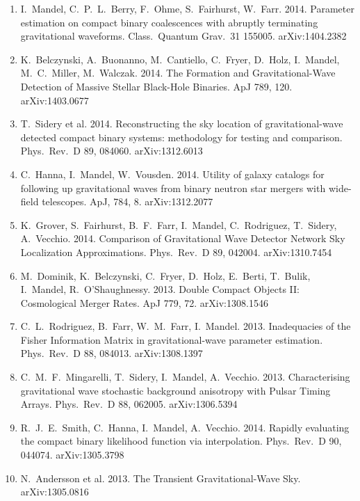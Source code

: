 \documentclass[margin,line]{res}
\begin{document}
\begin{resume}
\begin{enumerate}
\item  I.~Mandel, C.~P.~L.~Berry, F.~Ohme, S.~Fairhurst, W.~Farr.  2014. Parameter estimation on compact binary coalescences with abruptly terminating gravitational waveforms.  Class.~Quantum Grav.~31 155005. arXiv:1404.2382

\item  K.~Belczynski, A.~Buonanno, M.~Cantiello, C.~Fryer, D.~Holz, I.~Mandel, M.~C.~Miller, M.~Walczak.  2014. The Formation and Gravitational-Wave Detection of Massive Stellar Black-Hole Binaries.  ApJ 789, 120. arXiv:1403.0677

\item  T.~Sidery et al. 2014. Reconstructing the sky location of gravitational-wave detected compact binary systems: methodology for testing and comparison.  Phys.~Rev.~D 89, 084060.  arXiv:1312.6013

\item  C.~Hanna, I.~Mandel, W.~Vousden.  2014. Utility of galaxy catalogs for following up gravitational waves from binary neutron star mergers with wide-field telescopes. ApJ, 784, 8.  arXiv:1312.2077

\item  K.~Grover, S.~Fairhurst, B.~F.~Farr, I.~Mandel, C.~Rodriguez, T.~Sidery, A.~Vecchio.  2014.  Comparison of Gravitational Wave Detector Network Sky Localization Approximations.  Phys.~Rev.~D 89, 042004.  arXiv:1310.7454

\item  M.~Dominik, K.~Belczynski, C.~Fryer, D.~Holz, E.~Berti, T.~Bulik, I.~Mandel, R.~O'Shaughnessy. 2013.  Double Compact Objects II: Cosmological Merger Rates.  ApJ 779, 72. arXiv:1308.1546

\item  C.~L.~Rodriguez, B.~Farr, W.~M.~Farr, I.~Mandel.  2013.  Inadequacies of the Fisher Information Matrix in gravitational-wave parameter estimation.  Phys.~Rev.~D 88, 084013.  arXiv:1308.1397 

\item  C.~M.~F.~Mingarelli, T.~Sidery, I.~Mandel, A.~Vecchio.  2013.  Characterising gravitational wave stochastic background anisotropy with Pulsar Timing Arrays.  Phys.~Rev.~D 88, 062005. arXiv:1306.5394

\item  R.~J.~E.~Smith, C.~Hanna, I.~Mandel, A.~Vecchio.  2014.  Rapidly evaluating the compact binary likelihood function via interpolation.  Phys.~Rev.~D 90, 044074. arXiv:1305.3798

\item  N.~Andersson et al.  2013.  The Transient Gravitational-Wave Sky.  arXiv:1305.0816


\end{enumerate}
\end{resume}
\end{document}
